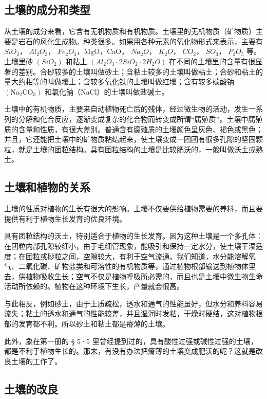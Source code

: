 \subsection{土壤的成分和类型}

从土壤的成分来看，它含有无机物质和有机物质。土壤里的无机物质（矿物质）主要是岩石的风化生成物。种类很多。如果用各种元素的氧化物形式来表示，主要有
\(SiO_{2}\)， \(Al_{2}O_{3}\)， \(Fe_{2}O_{3}\)，MgO，CaO，
\(Na_{2}O\)， \(K_{2}O\)， \(CO_{2}\)， \(SO_{3}\)， \(P_{2}O_{5}\)
等。土壤里砂 \((SiO_{2})\) 和粘土
\((Al_{2}O_{3}\cdot2SiO_{2}\cdot2H_{2}O)\)
在不同的土壤里的含量有很显著的差别。合砂较多的土壤叫做砂土；含粘土较多的土壤叫做粘土；合砂和粘土的量大约相等的叫做壤土；含较多氧化铁的土壤叫做红壤；含有较多碳酸钠
\(\left(\mathrm{Na}_{2}\mathrm{CO}_{3}\right)\)
和氯化钠（NaCl）的土壤叫做盐碱土。

土壤中的有机物质，主要来自动植物死亡后的残体，经过微生物的活动，发生一系列的分解和化合反应，逐渐变成复杂的化合物而转变成所谓``腐殖质''。土壤中腐殖质的含量和性质，有很大差别。普通含有腐殖质的土壤颜色呈灰色、褐色或黑色；并且，它还能把土壤中的矿物质粘结起来，使土壤变成一团团有很多孔隙的坚固颗粒，就是土壤的团粒结构。具有团粒结构的土壤是比较肥沃的，一般叫做沃土或熟土。

\subsection{土壤和植物的关系}

土壤的性质对植物的生长有很大的影响。土壤不仅要供给植物需要的养料，而且要提供有利于植物生长发育的优良环境。

具有团粒结构的沃土，特别适合于植物的生长发育。因为这种土壤是一个多孔体：在团粒内部孔隙较细小，由于毛细管现象，能吸引和保持一定水分，使土壤干湿适度；在团粒或砂粒之间，空隙较大，有利于空气流通。我们知道，水分能溶解氧气、二氧化碳、矿物盐类和可溶性的有机物质等，通过植物根部输送到植物体里去，供植物吸收生长；空气不仅是植物呼吸所必需的，而且也是土壤中微生物生命活动所依赖的。植物在这种环境下生长，产量就会很高。

与此相反，例如砂土，由于土质疏松，透水和通气的性能虽好，但水分和养料容易流失；粘土的透水和通气的性能较差，并且湿润时发粘，干燥时硬结，这对植物根部的发育都不利。所以砂土和粘土都是瘠薄的土壤。

此外，象在第一册的 § 5·5
里曾经提到过的，具有酸性过强或碱性过强的土壤，都是不利于植物生长的。那末，有没有办法把瘠薄的土壤变成肥沃的呢？这就是改良土壤的工作了。

\subsection{土壤的改良}

